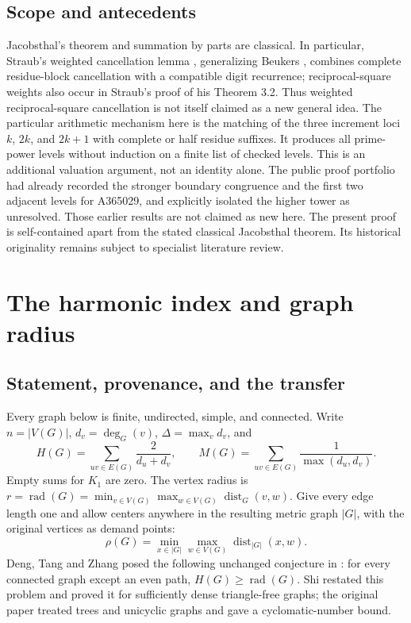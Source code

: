 \documentclass[11pt,a4paper]{article}
\theoremstyle{remark}\newtheorem{remark}[theorem]{Remark}
\newcommand{\rad}{\operatorname{rad}}\newcommand{\diam}{\operatorname{diam}}\newcommand{\dist}{\operatorname{dist}}
\numberwithin{equation}{section}
\begin{document}
\subsection{Scope and antecedents}
Jacobsthal's theorem and summation by parts are classical. In particular,
Straub's weighted cancellation lemma \cite[Lemma 5.6]{A:Straub}, generalizing
Beukers \cite[Lemma 3]{A:Beukers}, combines complete residue-block cancellation
with a compatible digit recurrence; reciprocal-square weights also occur
in Straub's proof of his Theorem 3.2. Thus weighted reciprocal-square
cancellation is not itself claimed as a new general idea. The particular
arithmetic mechanism here is the matching of the three increment loci
$k$, $2k$, and $2k+1$ with complete or half residue suffixes. It produces
all prime-power levels without induction on a finite list of checked
levels. This is an additional valuation argument, not an identity alone.
The public proof portfolio \cite{A:Bajaj} had already recorded the
stronger boundary congruence and the first two adjacent levels for
A365029, and explicitly isolated the higher tower as unresolved.
Those earlier results are not claimed as new here. The present proof
is self-contained apart from the stated classical Jacobsthal theorem.
Its historical originality remains subject to specialist literature review.


\section{The harmonic index and graph radius}

\subsection{Statement, provenance, and the transfer}
Every graph below is finite, undirected, simple, and connected. Write
$n=|V(G)|$, $d_v=\deg_G(v)$, $\Delta=\max_v d_v$, and
\[
 H(G)=\sum_{uv\in E(G)}\frac{2}{d_u+d_v},\qquad
 M(G)=\sum_{uv\in E(G)}\frac1{\max(d_u,d_v)}.
\]
Empty sums for $K_1$ are zero. The vertex radius is
$r=\rad(G)=\min_{v\in V(G)}\max_{w\in V(G)}\dist_G(v,w)$.
Give every edge length one and allow centers anywhere in the resulting
metric graph $|G|$, with the original vertices as demand points:
\[
 \rho(G)=\min_{x\in|G|}\max_{w\in V(G)}\dist_{|G|}(x,w).
\]
Deng, Tang and Zhang posed the following unchanged conjecture in
\cite[Conjecture~6.1]{H:DTZ}: for every connected graph except an even path,
$H(G)\ge\rad(G)$. Shi \cite[Conjecture~1.4]{H:Shi} restated this problem
and proved it for sufficiently dense triangle-free graphs; the original
paper treated trees and unicyclic graphs and gave a cyclomatic-number bound.
\end{document}
